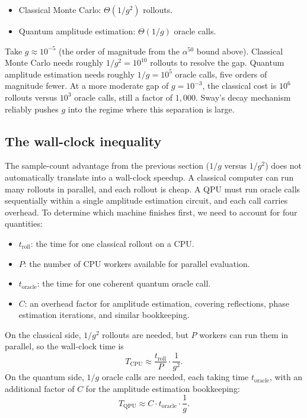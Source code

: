 \begin{itemize}
  \item Classical Monte Carlo: $\Theta(1/g^2)$ rollouts.
  \item Quantum amplitude estimation: $\Theta(1/g)$ oracle calls.
\end{itemize}

Take $g \approx 10^{-5}$ (the order of magnitude from the $\alpha^{50}$ bound above).
Classical Monte Carlo needs roughly $1/g^2 = 10^{10}$ rollouts to resolve the gap.
Quantum amplitude estimation needs roughly $1/g = 10^{5}$ oracle calls, five orders of magnitude fewer.
At a more moderate gap of $g = 10^{-3}$, the classical cost is $10^{6}$ rollouts versus $10^{3}$ oracle calls, still a factor of $1{,}000$.
Sway's decay mechanism reliably pushes $g$ into the regime where this separation is large.

\subsection{The wall-clock inequality}

The sample-count advantage from the previous section ($1/g$ versus $1/g^2$) does not automatically translate into a wall-clock speedup. A classical computer can run many rollouts in parallel, and each rollout is cheap. A QPU must run oracle calls sequentially within a single amplitude estimation circuit, and each call carries overhead. To determine which machine finishes first, we need to account for four quantities:

\begin{itemize}
  \item $t_{\text{roll}}$: the time for one classical rollout on a CPU.
  \item $P$: the number of CPU workers available for parallel evaluation.
  \item $t_{\text{oracle}}$: the time for one coherent quantum oracle call.
  \item $C$: an overhead factor for amplitude estimation, covering reflections, phase estimation iterations, and similar bookkeeping.
\end{itemize}

On the classical side, $1/g^2$ rollouts are needed, but $P$ workers can run them in parallel, so the wall-clock time is
\begin{equation}
T_{\text{CPU}} \approx \frac{t_{\text{roll}}}{P} \cdot \frac{1}{g^2}.
\end{equation}
On the quantum side, $1/g$ oracle calls are needed, each taking time $t_{\text{oracle}}$, with an additional factor of $C$ for the amplitude estimation bookkeeping:
\begin{equation}
T_{\text{QPU}} \approx C \cdot t_{\text{oracle}} \cdot \frac{1}{g}.
\end{equation}

